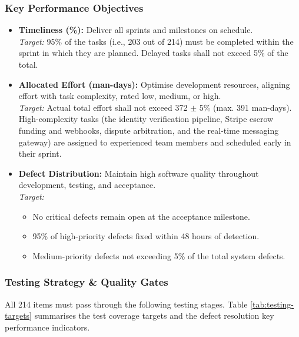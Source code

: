 \subsubsection{Key Performance Objectives}
\begin{itemize}
    \item \textbf{Timeliness (\%):} Deliver all sprints and milestones on schedule.\\
    \textit{Target:} 95\% of the tasks (i.e., 203 out of 214) must be completed within the sprint in which they are planned. Delayed tasks shall not exceed 5\% of the total.
    \item \textbf{Allocated Effort (man-days):} Optimise development resources, aligning effort with task complexity, rated low, medium, or high.\\
    \textit{Target:} Actual total effort shall not exceed 372 $\pm$ 5\% (max. 391 man-days). High-complexity tasks (the identity verification pipeline, Stripe escrow funding and webhooks, dispute arbitration, and the real-time messaging gateway) are assigned to experienced team members and scheduled early in their sprint.
    \item \textbf{Defect Distribution:} Maintain high software quality throughout development, testing, and acceptance.\\
    \textit{Target:}
    \begin{itemize}
        \item No critical defects remain open at the acceptance milestone.
        \item 95\% of high-priority defects fixed within 48 hours of detection.
        \item Medium-priority defects not exceeding 5\% of the total system defects.
    \end{itemize}
\end{itemize}

\subsubsection{Testing Strategy \& Quality Gates}
All 214 items must pass through the following testing stages. Table \ref{tab:testing-targets} summarises the test coverage targets and the defect resolution key performance indicators.

